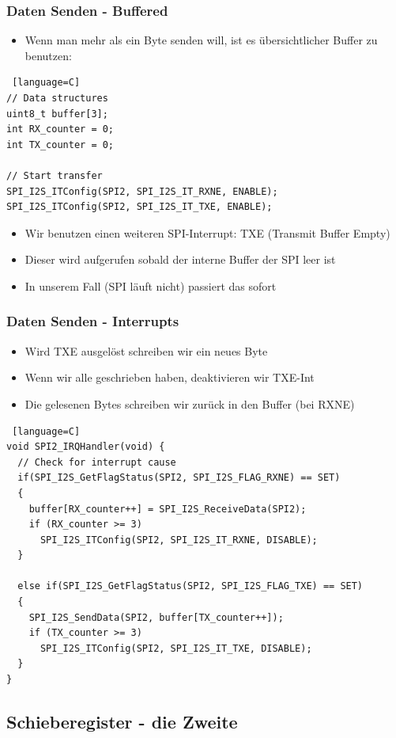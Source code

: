 \documentclass[ngerman,compress]{beamer}
\begin{document}
\begin{frame} [fragile]
	\frametitle{Daten Senden - Buffered}
	\begin{itemize}
		\item Wenn man mehr als ein Byte senden will, ist es übersichtlicher Buffer zu benutzen:
	\end{itemize}
	\begin{lstlisting} [language=C]
// Data structures
uint8_t buffer[3];
int RX_counter = 0;
int TX_counter = 0;

// Start transfer
SPI_I2S_ITConfig(SPI2, SPI_I2S_IT_RXNE, ENABLE);
SPI_I2S_ITConfig(SPI2, SPI_I2S_IT_TXE, ENABLE);
	\end{lstlisting}
	\begin{itemize}
		\item Wir benutzen einen weiteren SPI-Interrupt: TXE (Transmit Buffer Empty)
		\item Dieser wird aufgerufen sobald der interne Buffer der SPI leer ist
		\item In unserem Fall (SPI läuft nicht) passiert das sofort
	\end{itemize}
\end{frame}

\begin{frame} [fragile]
	\frametitle{Daten Senden - Interrupts}
	\begin{itemize}
		\item Wird TXE ausgelöst schreiben wir ein neues Byte
		\item Wenn wir alle geschrieben haben, deaktivieren wir TXE-Int
		\item Die gelesenen Bytes schreiben wir zurück in den Buffer (bei RXNE)
	\end{itemize}
	\begin{lstlisting} [language=C]
void SPI2_IRQHandler(void) {
  // Check for interrupt cause
  if(SPI_I2S_GetFlagStatus(SPI2, SPI_I2S_FLAG_RXNE) == SET)
  {
    buffer[RX_counter++] = SPI_I2S_ReceiveData(SPI2);
    if (RX_counter >= 3)
      SPI_I2S_ITConfig(SPI2, SPI_I2S_IT_RXNE, DISABLE);
  }

  else if(SPI_I2S_GetFlagStatus(SPI2, SPI_I2S_FLAG_TXE) == SET)
  {
    SPI_I2S_SendData(SPI2, buffer[TX_counter++]);
    if (TX_counter >= 3)
      SPI_I2S_ITConfig(SPI2, SPI_I2S_IT_TXE, DISABLE);
  }
}
	\end{lstlisting}
\end{frame}


\subsection{Schieberegister - die Zweite}
\end{document}
